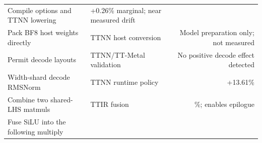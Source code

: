 \documentclass[
  10pt,
  american,
  10pt,
  letterpaper]{article}
\begin{document}
\begin{longtable}[]{@{}llr@{}}
\begin{minipage}[t]{0.30\columnwidth}
Compile options and TTNN lowering\strut
\end{minipage} & \begin{minipage}[t]{0.30\columnwidth}\raggedleft
+0.26\% marginal; near measured drift\strut
\end{minipage}\tabularnewline
\begin{minipage}[t]{0.30\columnwidth}\raggedright
Pack BF8 host weights directly\strut
\end{minipage} & \begin{minipage}[t]{0.30\columnwidth}\raggedright
TTNN host conversion\strut
\end{minipage} & \begin{minipage}[t]{0.30\columnwidth}\raggedleft
Model preparation only; not measured\strut
\end{minipage}\tabularnewline
\begin{minipage}[t]{0.30\columnwidth}\raggedright
Permit decode layouts\strut
\end{minipage} & \begin{minipage}[t]{0.30\columnwidth}\raggedright
TTNN/TT-Metal validation\strut
\end{minipage} & \begin{minipage}[t]{0.30\columnwidth}\raggedleft
No positive decode effect detected\strut
\end{minipage}\tabularnewline
\begin{minipage}[t]{0.30\columnwidth}\raggedright
Width-shard decode RMSNorm\strut
\end{minipage} & \begin{minipage}[t]{0.30\columnwidth}\raggedright
TTNN runtime policy\strut
\end{minipage} & \begin{minipage}[t]{0.30\columnwidth}\raggedleft
+13.61\%\strut
\end{minipage}\tabularnewline
\begin{minipage}[t]{0.30\columnwidth}\raggedright
Combine two shared-LHS matmuls\strut
\end{minipage} & \begin{minipage}[t]{0.30\columnwidth}\raggedright
TTIR fusion\strut
\end{minipage} & \begin{minipage}[t]{0.30\columnwidth}\raggedleft
-1.69\%; enables epilogue\strut
\end{minipage}\tabularnewline
\begin{minipage}[t]{0.30\columnwidth}\raggedright
Fuse SiLU into the following multiply\strut

\end{minipage}
\end{longtable}
\end{document}
